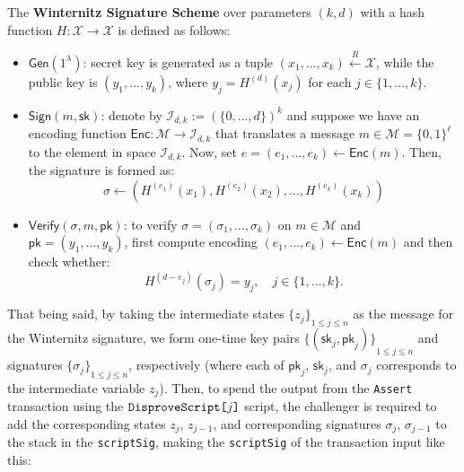 \documentclass{iacrtrans}
\begin{document}
\begin{definition}
  The \textbf{Winternitz Signature Scheme} over parameters $(k,d)$ with a hash
  function $H: \mathcal{X} \to \mathcal{X}$ is defined as follows:
  \begin{itemize}
    \item $\mathsf{Gen}(1^{\lambda})$: secret key is generated as a tuple
      $(x_1,\dots,x_k) \xleftarrow{R} \mathcal{X}$, while the public key is
      $(y_1,\dots,y_k)$, where $y_j = H^{(d)}(x_j)$ for each $j \in
      \{1,\dots,k\}$.
    \item $\mathsf{Sign}(m,\mathsf{sk})$: denote by $\mathcal{I}_{d,k} :=
      {(\{0,\dots,d\})}^k$ and suppose we have an encoding function
      $\mathsf{Enc}: \mathcal{M} \to \mathcal{I}_{d,k}$ that translates a
      message $m \in \mathcal{M} = {\{0,1\}}^{\ell}$ to the element in space
      $\mathcal{I}_{d,k}$. Now, set $e = (e_1,\dots,e_k) \gets \mathsf{Enc}(m)$.
      Then, the signature is formed as:
      \begin{equation*}
        \sigma \gets ({H}^{(e_1)}(x_1), H^{(e_2)}(x_2), \dots, H^{(e_k)}(x_k))
      \end{equation*}
    \item $\mathsf{Verify}(\sigma,m,\mathsf{pk})$: to verify $\sigma =
      (\sigma_1,\dots,\sigma_k)$ on $m \in \mathcal{M}$ and
      $\mathsf{pk}=(y_1,\dots,y_k)$, first compute encoding $(e_1,\dots,e_k)
      \gets \mathsf{Enc}(m)$ and then check whether:
      \begin{equation*}
        H^{(d-e_j)}(\sigma_j) = y_j, \quad j \in \{1,\dots,k\}.
      \end{equation*}
  \end{itemize}
\end{definition}

That being said, by taking the intermediate states ${\{z_j\}}_{1 \leq j \leq n}$
as the message for the Winternitz signature, we form one-time key pairs
${\{(\mathsf{sk}_j,\mathsf{pk}_j)\}}_{1 \leq j \leq n}$ and signatures
${\{\sigma_j\}}_{1 \leq j \leq n}$, respectively (where each of $\mathsf{pk}_j$,
$\mathsf{sk}_j$, and $\sigma_j$ corresponds to the intermediate variable $z_j$).
Then, to spend the output from the \texttt{Assert} transaction using the
$\texttt{DisproveScript[\text{$j$}]}$ script, the challenger is required to add
the corresponding states $z_j$, $z_{j-1}$, and corresponding signatures
$\sigma_j$, $\sigma_{j-1}$ to the stack in the \texttt{scriptSig}, making the
\texttt{scriptSig} of the transaction input like this:
\end{document}
